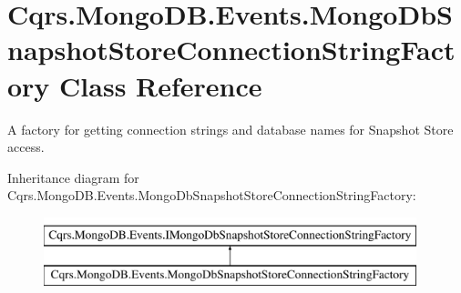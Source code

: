 \hypertarget{classCqrs_1_1MongoDB_1_1Events_1_1MongoDbSnapshotStoreConnectionStringFactory}{}\section{Cqrs.\+Mongo\+D\+B.\+Events.\+Mongo\+Db\+Snapshot\+Store\+Connection\+String\+Factory Class Reference}
\label{classCqrs_1_1MongoDB_1_1Events_1_1MongoDbSnapshotStoreConnectionStringFactory}


A factory for getting connection strings and database names for Snapshot Store access.  


Inheritance diagram for Cqrs.\+Mongo\+D\+B.\+Events.\+Mongo\+Db\+Snapshot\+Store\+Connection\+String\+Factory\+:\begin{figure}[H]
\begin{center}
\leavevmode
\includegraphics[height=2.000000cm]{classCqrs_1_1MongoDB_1_1Events_1_1MongoDbSnapshotStoreConnectionStringFactory}
\end{center}
\end{figure}

